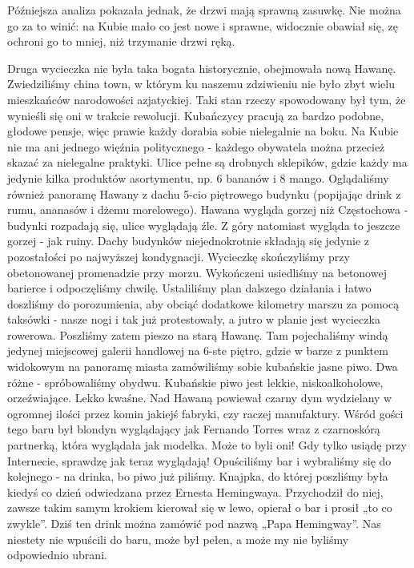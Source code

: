 Późniejsza analiza pokazała jednak, że drzwi mają sprawną zasuwkę.
Nie można go za to winić: na Kubie mało co jest nowe i sprawne, widocznie obawiał się, zę ochroni go to mniej, niż trzymanie drzwi ręką.
\par Druga wycieczka nie była taka bogata historycznie, obejmowała nową Hawanę.
Zwiedziliśmy china town, w którym ku naszemu zdziwieniu nie było zbyt wielu mieszkańców narodowości azjatyckiej.
Taki stan rzeczy spowodowany był tym, że wynieśli się oni w trakcie rewolucji.
Kubańczycy pracują za bardzo podobne, głodowe pensje, więc prawie każdy dorabia sobie nielegalnie na boku.
Na Kubie nie ma ani jednego więźnia politycznego - każdego obywatela można przecież skazać za nielegalne praktyki.
Ulice pełne są drobnych sklepików, gdzie każdy ma jedynie kilka produktów asortymentu, np.
6 bananów i 8 mango.
Oglądaliśmy również panoramę Hawany z dachu 5-cio piętrowego budynku (popijając drink z rumu, ananasów i dżemu morelowego).
Hawana wygląda gorzej niż Częstochowa - budynki rozpadają się, ulice wyglądają źle.
Z góry natomiast wygląda to jeszcze gorzej - jak ruiny.
Dachy budynków niejednokrotnie składają się jedynie z pozostałości po najwyższej kondygnacji.
Wycieczkę skończyliśmy przy obetonowanej promenadzie przy morzu.
Wykończeni usiedliśmy na betonowej barierce i odpoczęliśmy chwilę.
Ustaliliśmy plan dalszego działania i łatwo doszliśmy do porozumienia, aby obciąć dodatkowe kilometry marszu za pomocą taksówki - nasze nogi i tak już protestowały, a jutro w planie jest wycieczka rowerowa.
Poszliśmy zatem pieszo na starą Hawanę. Tam pojechaliśmy windą jedynej miejscowej galerii handlowej na 6-ste piętro, gdzie w barze z punktem widokowym na panoramę miasta zamówiliśmy sobie kubańskie jasne piwo.
Dwa różne - spróbowaliśmy obydwu.
Kubańskie piwo jest lekkie, niskoalkoholowe, orzeźwiające.
Lekko kwaśne.
Nad Hawaną powiewał czarny dym wydzielany w ogromnej ilości przez komin jakiejś fabryki, czy raczej manufaktury.
Wśród gości tego baru był blondyn wyglądający jak Fernando Torres wraz z czarnoskórą partnerką, która wyglądała jak modelka.
Może to byli oni!
Gdy tylko usiądę przy Internecie, sprawdzę jak teraz wyglądają!
Opuściliśmy bar i wybraliśmy się do kolejnego - na drinka, bo piwo już piliśmy.
Knajpka, do której poszliśmy była kiedyś co dzień odwiedzana przez Ernesta Hemingwaya.
Przychodził do niej, zawsze takim samym krokiem kierował się w lewo, opierał o bar i prosił „to co zwykle”.
Dziś ten drink można zamówić pod nazwą „Papa Hemingway”.
Nas niestety nie wpuścili do baru, może był pełen, a może my nie byliśmy odpowiednio ubrani.
